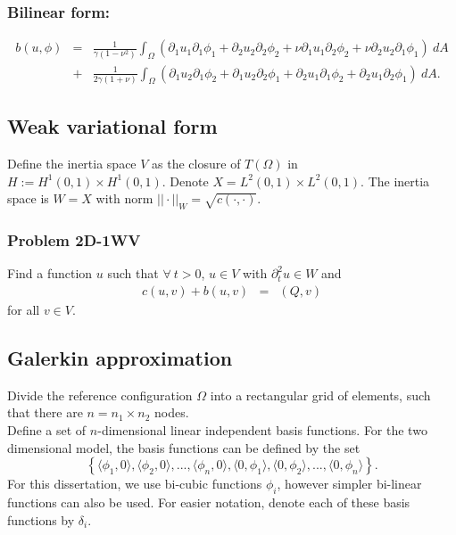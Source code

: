 \documentclass[../../main.tex]{subfiles}
\begin{document}
\subsubsection{Bilinear form:}
\begin{align}
	b(u,\phi) & = & \frac{1}{\gamma(1-\nu^2)}\int_{\Omega} (\partial_1 u_1 \partial_1 \phi_1 + \partial_2 u_2 \partial _2 \phi_2 + \nu\partial_1 u_1 \partial_2\phi_2 + \nu \partial_2 u_2 \partial_1 \phi_1 ) \ dA \nonumber\\
	& + & \frac{1}{2\gamma(1+\nu)}\int_{\Omega} (\partial_1 u_2 \partial_1 \phi_2 + \partial_1 u_2 \partial_2 \phi_1 + \partial_2 u_1 \partial_1\phi_2 + \partial_2 u_1 \partial_2\phi_1) \ dA.
\end{align}

\subsection{Weak variational form}
Define the inertia space $V$ as the closure of $T(\Omega)$ in $H := H^1(0,1)\times H^1(0,1)$. Denote $X = L^2(0,1)\times L^2(0,1)$. The inertia space is $W  = X$ with norm $||\cdot||_W = \sqrt{c(\cdot,\cdot)}$.

\subsubsection{Problem 2D-1WV}
Find a function $u$ such that $\forall \ t > 0$, $u \in V$ with $\partial_t^2 u \in W$ and
\begin{eqnarray*}
	c(u,v) + b(u,v) & = & (Q,v)
\end{eqnarray*}
for all $v\in V$.


\subsection{Galerkin approximation}\label{2d_FEM_G}
Divide the reference configuration $\Omega$ into a rectangular grid of elements, such that there are $n = n_1\times n_2$ nodes.\\

Define a set of $n$-dimensional linear independent basis functions. For the two dimensional model, the basis functions can be defined by the set $$\left\{\langle\phi_1, 0\rangle, \langle\phi_2, 0\rangle,...,\langle\phi_{n}, 0 \rangle,\langle 0,\phi_1\rangle,\langle 0 ,\phi_2\rangle,...,\langle 0,\phi_{n}\rangle \right\}.$$ For this dissertation, we use bi-cubic functions $\phi_i$, however simpler bi-linear functions can also be used. For easier notation, denote each of these basis functions by $\delta_i$.\\
\end{document}
